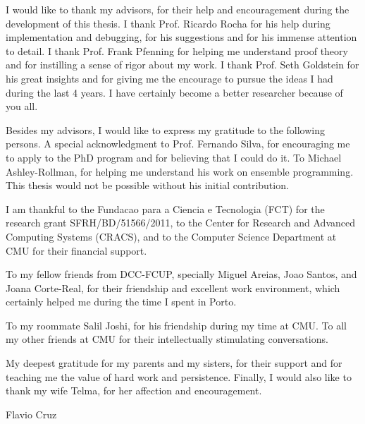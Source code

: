 I would like to thank my advisors, for their help and encouragement during the
development of this thesis. I thank Prof. Ricardo Rocha for his help during
implementation and debugging, for his suggestions and for his immense attention
to detail. I thank Prof. Frank Pfenning for helping me understand proof theory
and for instilling a sense of rigor about my work. I thank Prof. Seth Goldstein
for his great insights and for giving me the encourage to pursue the ideas I
had during the last 4 years. I have certainly become a better researcher
because of you all.

Besides my advisors, I would like to express my gratitude to the following
persons. A special acknowledgment to Prof. Fernando Silva, for encouraging me
to apply to the PhD program and for believing that I could do it.  To Michael
Ashley-Rollman, for helping me understand his work on ensemble programming.
This thesis would not be possible without his initial contribution.

I am thankful to the Fundacao para a Ciencia e Tecnologia (FCT) for the
research grant SFRH/BD/51566/2011, to the Center for Research and Advanced
Computing Systems (CRACS), and to the Computer Science Department at CMU for
their financial support.

To my fellow friends from DCC-FCUP, specially Miguel Areias, Joao Santos, and
Joana Corte-Real, for their friendship and excellent work environment, which
certainly helped me during the time I spent in Porto.

To my roommate Salil Joshi, for his friendship during my time at CMU. To all my
other friends at CMU for their intellectually stimulating conversations.

My deepest gratitude for my parents and my sisters, for their support and for
teaching me the value of hard work and persistence. Finally, I would also like
to thank my wife Telma, for her affection and encouragement.

\begin{flushright}
Flavio Cruz \\
\end{flushright}
